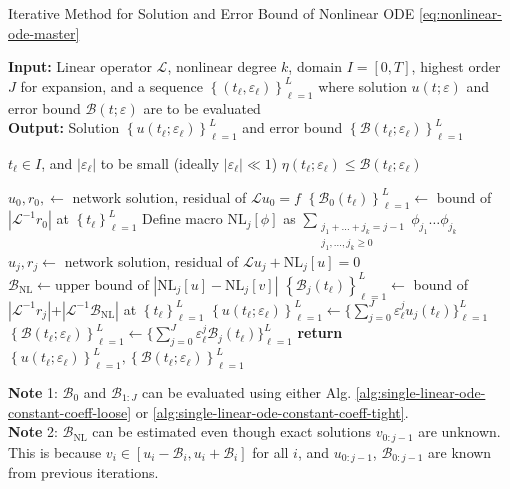 \documentclass[accepted]{uai2023}
\newcommand{\Err}{\eta}
\newcommand{\Bound}{\mathcal{B}}
\renewcommand{\L}{\mathcal{L}}
\begin{document}
    \begin{algorithm}
        \small
        \caption{Iterative Method for Solution and Error Bound of Nonlinear ODE \ref{eq:nonlinear-ode-master}} \label{alg:nonlinear-iterative}
        \textbf{Input:} Linear operator $\L$, nonlinear degree $k$, domain $I=[0, T]$, highest order $J$ for expansion, and a sequence $\left\{(t_\ell, \varepsilon_\ell)\right\}_{\ell=1}^{L}$ where solution $u(t; \varepsilon)$ and error bound $\Bound(t; \varepsilon)$ are to be evaluated \\
        \textbf{Output:} Solution $\left\{u(t_\ell; \varepsilon_\ell)\right\}_{\ell=1}^{L}$ and error bound $\left\{\Bound(t_\ell; \varepsilon_\ell)\right\}_{\ell=1}^{L}$ 
        \begin{algorithmic}
            \Require $t_\ell \in I$, and $|\varepsilon_\ell|$ to be small (ideally $|\varepsilon_\ell| \ll 1$)
            \Ensure $\Err(t_\ell; \varepsilon_\ell) \leq \Bound(t_\ell; \varepsilon_\ell)$ 

            \State $u_0, r_0, \gets$ network solution, residual of $\L u_0 = f$
            \State $\left\{\Bound_{0}(t_\ell)\right\}_{\ell=1}^L \gets$ bound of $\left|\L^{-1}r_0\right|$ at $\left\{t_\ell\right\}_{\ell=1}^L$
                \State Define macro $\text{NL}_j[\phi]$ as $\sum_{\substack{j_1 + \dots + j_k = j-1\\ j_1, \dots, j_k \geq 0}} \phi_{j_1} \dots \phi_{j_k}$
                \State $u_j, r_j \gets$ network solution, residual of $\L u_j + \text{NL}_j[u] = 0$
                \State $\Bound_{\text{NL}} \gets \text{upper bound of }|\text{NL}_j[u] - \text{NL}_j[v]|$
                \State $\left\{\Bound_{j}(t_\ell)\right\}_{\ell=1}^L \gets$  bound of $|\L^{-1}r_j|$+$|\L^{-1}\Bound_{\text{NL}}|$ at $\left\{t_\ell\right\}_{\ell=1}^L$
            \EndFor
            \State $\left\{u(t_\ell; \varepsilon_\ell)\right\}_{\ell=1}^L \gets \big\{\sum_{j=0}^{J}\varepsilon_\ell^j u_j(t_\ell)\big\}_{\ell=1}^L $ 
            \State $\left\{\Bound(t_\ell; \varepsilon_\ell)\right\}_{\ell=1}^L \gets \big\{\sum_{j=0}^{J}\varepsilon_\ell^j \Bound_j(t_\ell)\big\}_{\ell=1}^L $ 
            \State \textbf{return} $\left\{u(t_\ell; \varepsilon_\ell)\right\}_{\ell=1}^L, \left\{\Bound(t_\ell; \varepsilon_\ell)\right\}_{\ell=1}^L$
        \end{algorithmic}
        \vspace{0.5em}

        \textbf{Note} 1: $\Bound_0$ and $\Bound_{1:J}$ can be evaluated using either Alg. \ref{alg:single-linear-ode-constant-coeff-loose} or \ref{alg:single-linear-ode-constant-coeff-tight}.\\
        \textbf{Note} 2: $\Bound_\text{NL}$ can be estimated even though exact solutions $v_{0:j-1}$ are unknown. This is because $v_i \in [u_i - \Bound_i, u_i+\Bound_i]$ for all $i$, and $u_{0:j-1}$, $\Bound_{0:j-1}$ are known from previous iterations.
    \end{algorithm}
\end{document}
